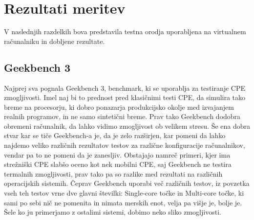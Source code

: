 \section{Rezultati meritev}

V naslednjih razdelkih bova predstavila testna orodja uporabljena na virtualnem računalniku in dobljene rezultate.

\subsection{Geekbench 3}
Najprej sva pognala Geekbench 3, benchmark, ki se uporablja za testiranje CPE zmogljivosti. Imel naj bi to prednost pred klasičnimi testi CPE, da simulira tako breme na procesorju, ki dobro ponazarja produkcijsko okolje med izvajanjem realnih programov, in ne samo sintetični breme. Prav tako Geekbench dodobra obremeni računalnik, da lahko vidimo zmogljivost ob velikem stresu. Še ena dobra stvar kar se tiče Geekbench-a je, da je zelo razširjen, kar pomeni da lahko najdemo veliko različnih rezultatov testov za različne konfiguracije računalnikov, vendar pa to ne pomeni da je zanesljiv. Obstajajo namreč primeri, kjer ima strežniški CPE slabšo oceno kot nek mobilni CPE, saj Geekbench ne testira termalnih zmogljivosti, prav tako pa so razlike med rezultati na različnih operacijskih sistemih. Čeprav Geekbench uporabi več različnih testov, iz povzetka vseh teh testov vrne dve glavni številki: Single-core točke in Multi-core točke, ki sami po sebi nič ne pomenita in nimata merskih enot, velja pa višje je, bolje je. Šele ko ju primerjamo z ostalimi sistemi, dobimo neko sliko zmogljivosti. 


